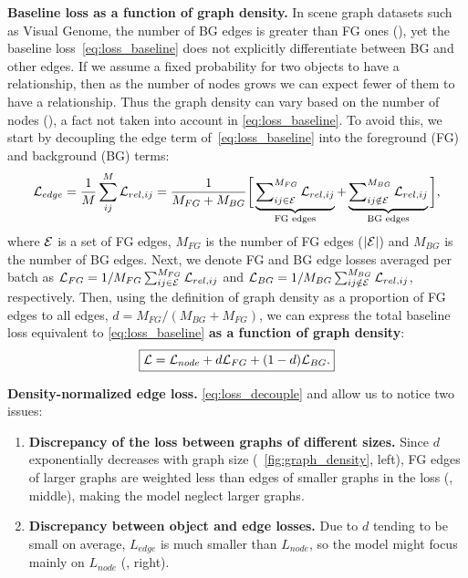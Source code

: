\textbf{Baseline loss as a function of graph density.}
In scene graph datasets such as Visual Genome, the number of BG edges is greater than FG ones (\fig{\ref{fig:pred_distr}}), yet the baseline loss~\eqref{eq:loss_baseline} does not explicitly differentiate between BG and other edges. If we assume a fixed probability for two objects to have a relationship, then as the number of nodes grows we can expect fewer of them to have a relationship. Thus the graph density can vary based on the number of nodes (\fig{\ref{fig:graph_density}}), a fact not taken into account in \eqref{eq:loss_baseline}.
To avoid this, we start by decoupling the edge term of~\eqref{eq:loss_baseline} into the foreground (FG) and background (BG) terms:
%
\begin{equation}
{\cal L}_{edge} = \frac{1}{M}\sum_{ij}^M{\cal L}_{rel,ij} =  \frac{1}{M_{FG} + M_{BG}} \bigg[ \underbrace{\sum\nolimits_{ij \in \cal E}^{M_{FG}}{\cal L}_{rel,ij}}_{\text{FG edges}} + \underbrace{\sum\nolimits_{ij \notin \cal E}^{M_{BG}}{\cal L}_{rel,ij}}_{\text{BG edges}} \bigg]  ,
\end{equation}
%
\noindent where ${\cal E}$ is a set of FG edges, $M_{FG}$ is the number of FG edges ($|{\cal E}|$) and $M_{BG}$ is the number of BG edges.
Next, we denote FG and BG edge losses averaged per batch as ${\cal L}_{FG}=1/M_{FG}\sum_{ij \in \cal E}^{M_{FG}}{\cal L}_{rel,ij}$ and ${\cal L}_{BG}=1/M_{BG}\sum_{ij \notin \cal E}^{M_{BG}}{\cal L}_{rel,ij}$, respectively.
Then, using the definition of graph density as a proportion of FG edges to all edges, $d=M_{FG} / (M_{BG} + M_{FG})$, we can express the total baseline loss equivalent to \eqref{eq:loss_baseline} \textbf{as a function of graph density}:
%
\begin{equation}
\label{eq:loss_decouple}
\boxed{
	{\cal L} = {\cal L}_{node} + d {\cal L}_{FG}  + (1 - d) {\cal L}_{BG}.}
\end{equation}


\noindent\textbf{Density-normalized edge loss.}
\eqref{eq:loss_decouple} and \fig{\ref{fig:graph_density}} allow us to notice two issues:

\begin{enumerate}[leftmargin=10pt,labelsep=2pt]%
	\itemsep0em 
	\item \textbf{Discrepancy of the loss between graphs of different sizes.} Since $d$ exponentially decreases with graph size (~\ref{fig:graph_density}, left), FG edges of larger graphs are weighted less than edges of smaller graphs in the loss (\fig{\ref{fig:graph_density}}, middle), making the model neglect larger graphs.
	
	\item \textbf{Discrepancy between object and edge losses.}
	Due to $d$ tending to be small on average, $L_{edge}$ is much smaller than $L_{node}$, so the model might focus mainly on $L_{node}$ (\fig{\ref{fig:graph_density}}, right).
\end{enumerate}

